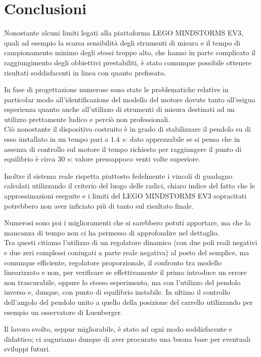 \chapter{Conclusioni}
Nonostante alcuni limiti legati alla piattaforma LEGO MINDSTORMS EV3, quali ad esempio la scarsa sensibilità degli strumenti di misura e il tempo di campionamento minimo degli stessi troppo alto, che hanno in parte complicato il raggiungimento degli obbiettivi prestabiliti, è stato comunque possibile ottenere risultati soddisfacenti in linea con quanto prefissato.

In fase di progettazione numerose sono state le problematiche relative in particolar modo all'identificazione del modello del motore dovute tanto all'esigua esperienza quanto anche all'utilizzo di strumenti di misura destinati ad un utilizzo prettamente ludico e perciò non professionali.\\
Ciò nonostante il dispositivo costruito è in grado di stabilizzare il pendolo su di esso installato in un tempo pari a $1.4$ $s$: dato apprezzabile se si pensa che in assenza di controllo sul motore il tempo richiesto per raggiungere il punto di equilibrio è circa $30$ $s$: valore pressappoco venti volte superiore.

Inoltre il sistema reale rispetta piuttosto fedelmente i vincoli di guadagno calcolati utilizzando il criterio del luogo delle radici, chiaro indice del fatto che le approssimazioni eseguite e i limiti del LEGO MINDSTORMS EV3 sopracitati potrebbero non aver inficiato più di tanto sul risultato finale.

Numerosi sono poi i miglioramenti che si sarebbero potuti apportare, ma che la mancanza di tempo non ci ha permesso di approfondire nel dettaglio.\\
Tra questi citiamo l'utilizzo di un regolatore dinamico (con due poli reali negativi e due zeri complessi coniugati a parte reale negativa) al posto del semplice, ma comunque efficiente, regolatore proporzionale, il confronto tra modello linearizzato e non, per verificare se effettivamente il primo introduce un errore non trascurabile, oppure lo stesso esperimento, ma con l'utilizzo del pendolo inverso e, dunque, con punto di equilibrio instabile. In ultimo il controllo dell'angolo del pendolo unito a quello della posizione del carrello utilizzando per esempio un osservatore di Luenberger.

Il lavoro svolto, seppur migliorabile, è stato ad ogni modo soddisfacente e didattico; ci auguriamo dunque di aver procurato una buona base per eventuali sviluppi futuri.



